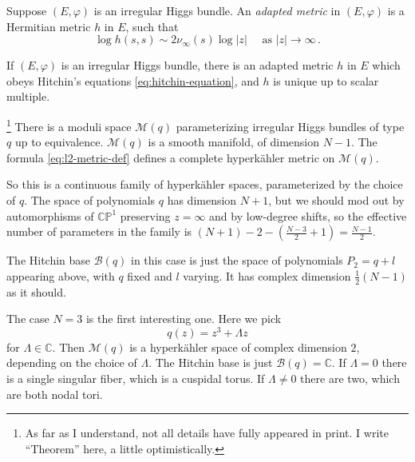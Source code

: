 \documentclass[12pt,letterpaper,reqno]{article}
\numberwithin{equation}{section}
\begin{document}
\begin{defn}
Suppose $(E,\varphi)$ is an irregular Higgs bundle. An \textit{adapted metric} in $(E,\varphi)$ is a Hermitian metric $h$ in $E$, such that
\begin{equation}
\log h(s,s) \sim 2 \nu_\infty(s) \log \lvert z \rvert \quad \text{ as } \lvert z \rvert \to \infty \, . 
\end{equation}
\end{defn}

\begin{thm}
If $(E,\varphi)$ is an irregular Higgs bundle, there is an adapted metric $h$ in $E$ which obeys Hitchin's equations \eqref{eq:hitchin-equation}, and $h$ is unique up to scalar multiple.
\end{thm}

\begin{thm}\footnote{As far as I understand, not all 
details have fully appeared in print. I write ``Theorem'' here, a little optimistically.}
There is a moduli space $\mathcal M(q)$ parameterizing irregular Higgs bundles of type $q$ up to equivalence.
$\mathcal M(q)$ is a smooth manifold, of dimension $N-1$.
The formula \eqref{eq:l2-metric-def} defines a complete hyperk\"ahler metric on $\mathcal M(q)$.
\end{thm}

So this is a continuous family of hyperk\"ahler spaces, parameterized by the choice of $q$.
The space of polynomials $q$ has dimension $N+1$, but we should mod out by automorphisms
of $\mathbb C\mathbb P^1$ preserving $z = \infty$ and by low-degree shifts,
so the effective number of parameters in the family 
is $(N+1) - 2 - (\frac{N-3}{2} + 1) = \frac{N-1}{2}$.

The Hitchin base $\mathcal B(q)$ in this case is just the space of polynomials 
$P_2 = q + l$ appearing above, with $q$ fixed and $l$ varying.
It has complex dimension $\frac12(N-1)$ as it should.

\begin{example}
The case $N=3$ is the first interesting one. Here we pick
\begin{equation}
  q(z) = z^3 + \Lambda z
\end{equation}
for $\Lambda \in \mathbb C$. Then $\mathcal M(q)$ is a hyperk\"ahler space of complex dimension $2$,
depending on the choice of $\Lambda$. The Hitchin base is just $\mathcal B(q) = \mathbb C$.
If $\Lambda = 0$ there is a single singular fiber, which is a cuspidal torus.
If $\Lambda \neq 0$ there are two, which are both nodal tori.
\end{example}
\end{document}
